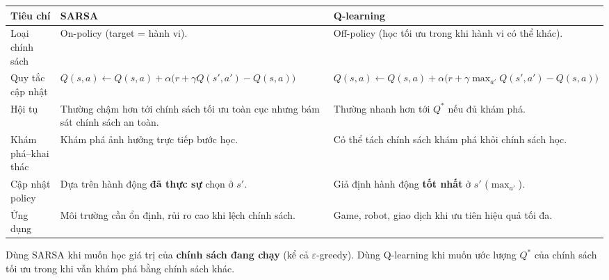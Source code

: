 \begin{vidu}[title={Bảng so sánh}]
\begin{tabularx}{\linewidth}{>{\raggedright\arraybackslash}p{3.4cm}XX}
\textbf{Tiêu chí} & \textbf{SARSA} & \textbf{Q-learning} \\
\midrule
Loại chính sách &
On-policy (target = hành vi). &
Off-policy (học tối ưu trong khi hành vi có thể khác). \\
Quy tắc cập nhật &
$Q(s,a) \leftarrow Q(s,a) + \alpha\bigl(r + \gamma Q(s',a') - Q(s,a)\bigr)$ &
$Q(s,a) \leftarrow Q(s,a) + \alpha\bigl(r + \gamma \max_{a'} Q(s',a') - Q(s,a)\bigr)$ \\
Hội tụ &
Thường chậm hơn tới chính sách tối ưu toàn cục nhưng bám sát chính sách an toàn. &
Thường nhanh hơn tới $Q^*$ nếu đủ khám phá. \\
Khám phá--khai thác &
Khám phá ảnh hưởng trực tiếp bước học. &
Có thể tách chính sách khám phá khỏi chính sách học. \\
Cập nhật policy &
Dựa trên hành động \textbf{đã thực sự} chọn ở $s'$. &
Giả định hành động \textbf{tốt nhất} ở $s'$ ($\max_{a'}$). \\
Ứng dụng &
Môi trường cần ổn định, rủi ro cao khi lệch chính sách. &
Game, robot, giao dịch khi ưu tiên hiệu quả tối đa. \\
\end{tabularx}
\end{vidu}

\begin{luuy}[title={Chọn thuật toán}]
Dùng SARSA khi muốn học giá trị của \textbf{chính sách đang chạy} (kể cả $\varepsilon$-greedy). Dùng Q-learning khi muốn ước lượng $Q^*$ của chính sách tối ưu trong khi vẫn khám phá bằng chính sách khác.
\end{luuy}
